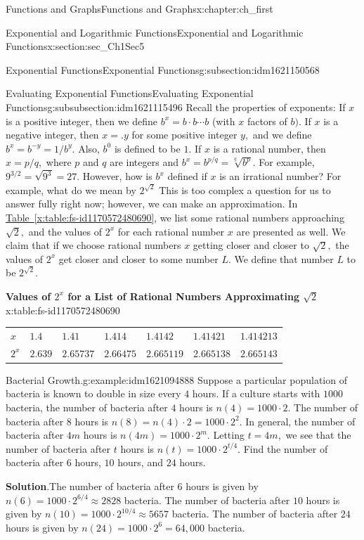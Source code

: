 \documentclass[oneside,10pt,]{book}
\newcommand{\blocktitlefont}{\relax}
\newcommand{\tabularfont}{\relax}
\newcommand{\xreffont}{\relax}
\numberwithin{equation}{section}
\begin{document}
\begin{chapterptx}{Functions and Graphs}{}{Functions and Graphs}{}{}{x:chapter:ch_first}
\begin{sectionptx}{Exponential and Logarithmic Functions}{}{Exponential and Logarithmic Functions}{}{}{x:section:sec_Ch1Sec5}
\begin{subsectionptx}{Exponential Functions}{}{Exponential Functions}{}{}{g:subsection:idm1621150568}
\begin{subsubsectionptx}{Evaluating Exponential Functions}{}{Evaluating Exponential Functions}{}{}{g:subsubsection:idm1621115496}
Recall the properties of exponents: If \(x\) is a positive integer, then we define \(b^x=b\cdot b\cdots b\) (with \(x\) factors of \(b).\) If \(x\) is a negative integer, then \(x=.y\) for some positive integer \(y,\) and we define \(b^x=b^{-y}=1/b^y.\) Also, \(b^0\) is defined to be \(1.\) If \(x\) is a rational number, then \(x=p/q,\) where \(p\) and \(q\) are integers and \(b^x=b^{p/q}=\sqrt[q]{b^p}.\) For example, \(9^{3/2}=\sqrt{9^3}=27.\) However, how is \(b^x\) defined if \(x\) is an irrational number? For example, what do we mean by \(2^{\sqrt{2}}\) This is too complex a question for us to answer fully right now; however, we can make an approximation. In \hyperref[x:table:fs-id1170572480690]{Table~{\xreffont\ref{x:table:fs-id1170572480690}}}, we list some rational numbers approaching \(\sqrt{2},\) and the values of \(2^x\) for each rational number \(x\) are presented as well. We claim that if we choose rational numbers \(x\) getting closer and closer to \(\sqrt{2},\) the values of \(2^x\) get closer and closer to some number \(L.\) We define that number \(L\) to be \(2^{\sqrt{2}}.\)%
\begin{tableptx}{\textbf{Values of \(2^x\) for a List of Rational Numbers Approximating \(\sqrt{2}\)}}{x:table:fs-id1170572480690}{}%
\centering%
{\tabularfont%
\begin{tabular}{lllllll}
\(x\)&\(1.4\)&\(1.41\)&\(1.414\)&\(1.4142\)&\(1.41421\)&\(1.414213\)\tabularnewline[0pt]
\(2^x\)&\(2.639\)&\(2.65737\)&\(2.66475\)&\(2.665119\)&\(2.665138\)&\(2.665143\)
\end{tabular}
}%
\end{tableptx}%
\begin{example}{Bacterial Growth.}{g:example:idm1621094888}%
Suppose a particular population of bacteria is known to double in size every \(4\) hours. If a culture starts with \(1000\) bacteria, the number of bacteria after \(4\) hours is \(n(4)=1000\cdot 2.\) The number of bacteria after \(8\) hours is \(n(8)=n(4)\cdot 2=1000\cdot 2^2.\) In general, the number of bacteria after \(4m\) hours is \(n(4m)=1000\cdot 2^m.\) Letting \(t=4m,\) we see that the number of bacteria after \(t\) hours is \(n(t)=1000\cdot 2^{t/4}.\) Find the number of bacteria after \(6\) hours, \(10\) hours, and \(24\) hours.%
\par\smallskip%
\noindent\textbf{\blocktitlefont Solution}.\hypertarget{g:solution:idm1621087464}{}\quad{}The number of bacteria after 6 hours is given by \(n(6)=1000\cdot 2^{6/4} \approx 2828\) bacteria. The number of bacteria after \(10\) hours is given by \(n(10)=1000\cdot 2^{10/4}\approx5657\) bacteria. The number of bacteria after \(24\) hours is given by \(n(24)=1000\cdot 2^6=64,000\) bacteria.%

\end{example}
\end{subsubsectionptx}
\end{subsectionptx}
\end{sectionptx}
\end{chapterptx}
\end{document}
